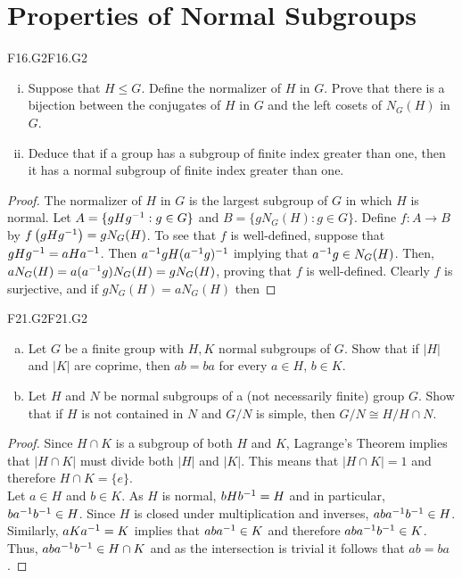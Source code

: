 \documentclass[../AlgebraQualSolutions.tex]{subfiles}
\begin{document}
\section{Properties of Normal Subgroups}

	\begin{prob}{F16.G2}{F16.G2}
		\begin{enumerate}[(i)]
			\item Suppose that $H \leq G$. Define the normalizer of $H$ in $G$. Prove that there is a bijection between the conjugates of $H$ in $G$ and the left cosets of $N_G(H)$ in $G$.
			\item Deduce that if a group has a subgroup of finite index greater than one, then it has a normal subgroup of finite index greater than one.
		\end{enumerate}
	\end{prob}

	\begin{proof}
		The normalizer of $H$ in $G$ is the largest subgroup of $G$ in which $H$ is normal. Let $A = \{gHg^{-1}: g \in G\}$ and $B = \{gN_G(H): g \in G\}$. Define $f: A \to B$ by $f\left(gHg^{-1}\right) = gN_G(H)$. To see that $f$ is well-defined, suppose that $gHg^{-1} = aHa^{-1}$. Then $a^{-1} g H  (a^{-1} g)^{-1}$ implying that $a^{-1} g \in N_G(H)$. Then, $aN_G(H) = a(a^{-1} g)N_G(H) = gN_G(H)$, proving that  $f$ is well-defined. Clearly $f$ is surjective, and if $gN_G(H) = aN_G(H)$ then 
	\end{proof}

	\begin{prob}{F21.G2}{F21.G2}
	\begin{enumerate}[(a)]
	\item Let $G$ be a finite group with $H,K$ normal subgroups of $G$. Show that if $|H|$ and $|K|$ are coprime, then $ab = ba$ for every $a \in H$, $b \in K$.
	\item Let $H$ and $N$ be normal subgroups of a (not necessarily finite) group $G$. Show that if $H$ is not contained in $N$ and $G/N$ is simple, then $G/N \cong H/H\cap N$.
	\end{enumerate}
	\end{prob}
	
	\begin{proof}
	Since  $H \cap K$ is a subgroup of both $H$ and $K$, Lagrange's Theorem implies that $|H \cap K|$ must divide both $|H|$ and $|K|$. This means that $|H \cap K| =1$ and therefore $H \cap K = \{e\}$.\\
	
	Let $a \in H$ and $b \in K$. As $H$ is normal, $bHb^{-1} = H$ and in particular, $ba^{-1} b^{-1} \in H$. Since $H$ is closed under multiplication and inverses, $aba^{-1} b^{-1} \in H$. Similarly, $aK a^{-1} = K$ implies that $aba^{-1} \in K$ and therefore $aba^{-1} b^{-1} \in K$. Thus, $aba^{-1} b^{-1} \in H \cap K$ and as the intersection is trivial it follows that $ab =ba$.
	\end{proof}
	
\end{document}
